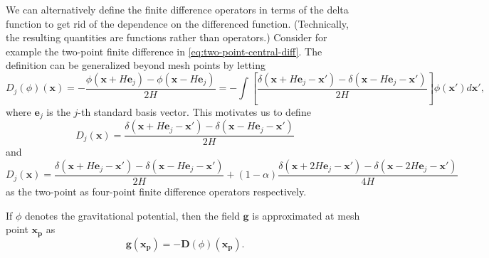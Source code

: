 We can alternatively define the finite difference operators in terms of the delta function to get rid of the dependence on the differenced function. (Technically, the resulting quantities are functions rather than operators.)
Consider for example the two-point finite difference in \autoref{eq:two-point-central-diff}.
The definition can be generalized beyond mesh points by letting
\begin{equation*}
    D_j(\phi)(\mathbf{x}) = -\frac{\phi(\mathbf{x} + H \mathbf{e}_j)-\phi (\mathbf{x} - H \mathbf{e}_j)}{2H} = -\int \left[ \frac{\delta(\mathbf{x} + H\mathbf{e}_j - \mathbf{x}') - \delta(\mathbf{x} - H\mathbf{e}_j - \mathbf{x}')}{2H} \right]\phi(\mathbf{x}')d\mathbf{x}',
\end{equation*}
where $\mathbf{e}_j$ is the $j$-th standard basis vector.
This motivates us to define
\begin{equation}\label{eq:two-point-central-diff}
    D_j(\mathbf{x}) = \frac{\delta(\mathbf{x} + H\mathbf{e}_j - \mathbf{x}') - \delta(\mathbf{x} - H\mathbf{e}_j - \mathbf{x}')}{2H}
\end{equation}
and
\begin{equation}\label{eq:four-point-central-diff}
    D_j(\mathbf{x}) = \frac{\delta(\mathbf{x} + H\mathbf{e}_j - \mathbf{x}') - \delta(\mathbf{x} - H\mathbf{e}_j - \mathbf{x}')}{2H} + (1-\alpha)\frac{\delta(\mathbf{x} + 2H\mathbf{e}_j - \mathbf{x}') - \delta(\mathbf{x} - 2H\mathbf{e}_j - \mathbf{x}')}{4H}
\end{equation}
as the two-point as four-point finite difference operators respectively.

If $\phi$ denotes the gravitational potential, then the field $\mathbf{g}$ is approximated at mesh point $\mathbf{x}_\mathbf{p}$ as
\begin{equation*}
    \mathbf{g}(\mathbf{x}_\mathbf{p}) = -\mathbf{D}(\phi)(\mathbf{x}_\mathbf{p}).
\end{equation*}

